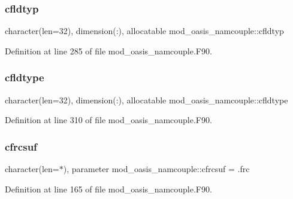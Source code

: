 \subsubsection{\texorpdfstring{cfldtyp}{cfldtyp}}
{\footnotesize\ttfamily character(len=32), dimension(\+:), allocatable mod\+\_\+oasis\+\_\+namcouple\+::cfldtyp\hspace{0.3cm}{\ttfamily [private]}}



Definition at line 285 of file mod\+\_\+oasis\+\_\+namcouple.\+F90.

\mbox{\label{namespacemod__oasis__namcouple_a069dc714cb69e8ddb649f1d9eb8c7454}} 
\subsubsection{\texorpdfstring{cfldtype}{cfldtype}}
{\footnotesize\ttfamily character(len=32), dimension(\+:), allocatable mod\+\_\+oasis\+\_\+namcouple\+::cfldtype\hspace{0.3cm}{\ttfamily [private]}}



Definition at line 310 of file mod\+\_\+oasis\+\_\+namcouple.\+F90.

\mbox{\label{namespacemod__oasis__namcouple_aa2b2f64544e85c57f11059d22d0b2463}} 
\subsubsection{\texorpdfstring{cfrcsuf}{cfrcsuf}}
{\footnotesize\ttfamily character(len=$\ast$), parameter mod\+\_\+oasis\+\_\+namcouple\+::cfrcsuf = \textquotesingle{}.frc\textquotesingle{}\hspace{0.3cm}{\ttfamily [private]}}



Definition at line 165 of file mod\+\_\+oasis\+\_\+namcouple.\+F90.

\mbox{\label{namespacemod__oasis__namcouple_aa219f127d0d00ba6ecd3972c4c4ed47f}} 
